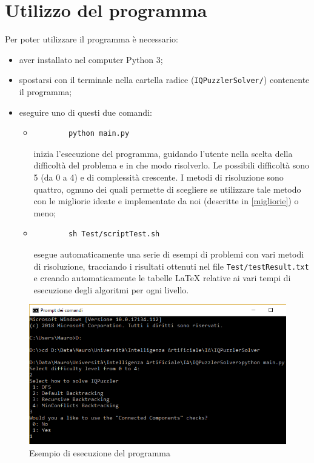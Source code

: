 \section{Utilizzo del programma}
Per poter utilizzare il programma è necessario:
\begin{itemize}
	\item aver installato nel computer Python 3;
	\item spostarsi con il terminale nella cartella radice (\texttt{IQPuzzlerSolver/}) contenente il programma;
	\item eseguire uno di questi due comandi:
	\begin{itemize}
		\item \begin{verbatim}
		python main.py
		\end{verbatim}inizia l'esecuzione del programma, guidando l'utente nella scelta della difficoltà del problema e in che modo risolverlo. Le possibili difficoltà sono 5 (da 0 a 4) e di complessità crescente. I metodi di risoluzione sono quattro, ognuno dei quali permette di scegliere se utilizzare tale metodo con le migliorie ideate e implementate da noi (descritte in \ref{migliorie}) o meno; 
		\item \begin{verbatim}
		sh Test/scriptTest.sh
		\end{verbatim}esegue automaticamente una serie di esempi di problemi con vari metodi di risoluzione, tracciando i risultati ottenuti nel file \texttt{Test/testResult.txt} e creando automaticamente le tabelle \LaTeX{} relative ai vari tempi di esecuzione degli algoritmi per ogni livello. 
	\end{itemize}
\end{itemize}
\begin{figure}[h]
	\centering
	\includegraphics[scale=0.65]{immagini/exe}
	\caption{Esempio di esecuzione del programma}
	\label{fig:exe}
\end{figure}


